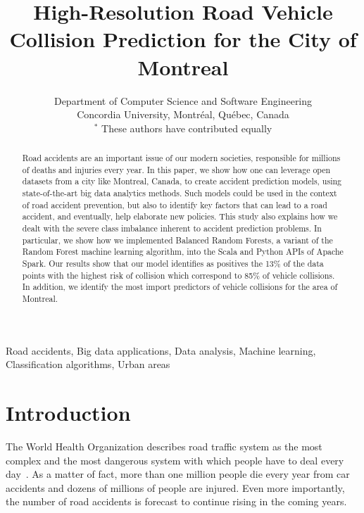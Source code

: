 \documentclass[conference]{IEEEtran}
\begin{document}
\title{High-Resolution Road Vehicle Collision Prediction for the City of Montreal}
\author{
Department of Computer Science and Software Engineering \\
Concordia University, Montréal, Québec, Canada\\
$^*$ These authors have contributed equally

}

\maketitle

\begin{abstract}

Road accidents are an important issue of our modern societies, responsible
for millions of deaths and injuries every year. 
In this paper, we show how one can leverage open datasets from a city like
Montreal, Canada, to create accident prediction models, using state-of-the-art
big data analytics methods.
Such models could be used in the context of road accident prevention, but also
to identify key factors that can lead to a road accident, and eventually, help
elaborate new policies.
This study also explains how we dealt with the severe class imbalance inherent
to accident prediction problems.
In particular, we show how we implemented Balanced Random Forests, a variant
of the Random Forest machine learning algorithm, into the Scala and Python
APIs of Apache Spark.
Our results show that our model identifies as positives the 13\% of the data
points with the highest risk of collision which correspond to 85\% of 
vehicle collisions.
In addition, we identify the most import predictors of vehicle collisions for the area of Montreal.

\end{abstract}

\begin{IEEEkeywords}
Road accidents, Big data applications, Data analysis, Machine learning, Classification algorithms, Urban areas
\end{IEEEkeywords}

\section{Introduction}

The World Health Organization describes road traffic system as the most
complex and the most dangerous system with which people have to deal every
day~\cite{Peden2004}. As a matter of fact, more than one million people
die every year from car accidents and dozens of millions of people are
injured. Even more importantly, the number of road accidents is forecast to
continue rising in the coming years.
\end{document}
